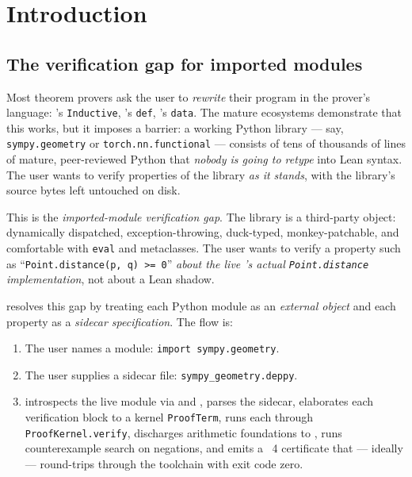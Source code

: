 \chapter{Introduction}
\label{ch:intro}

\section{The verification gap for imported modules}
\label{sec:gap}

Most theorem provers ask the user to \emph{rewrite} their program in
the prover's language: \Coq's \texttt{Inductive}, \Lean's
\texttt{def}, \Agda's \texttt{data}.  The mature ecosystems
\citep{LeanFour, LeanCommunityMathlib} demonstrate that this works,
but it imposes a barrier: a working Python library --- say,
\texttt{sympy.geometry} or \texttt{torch.nn.functional} --- consists
of tens of thousands of lines of mature, peer-reviewed Python that
\emph{nobody is going to retype} into Lean syntax.  The user wants to
verify properties of the library \emph{as it stands}, with the
library's source bytes left untouched on disk.

This is the \emph{imported-module verification gap}.  The library is
a third-party object: dynamically dispatched, exception-throwing,
duck-typed, monkey-patchable, and comfortable with \texttt{eval} and
metaclasses.  The user wants to verify a property such as
``\texttt{Point.distance(p, q) >= 0}'' \emph{about the live
\Sympy{}'s actual \texttt{Point.distance} implementation}, not about a
Lean shadow.

\Deppy{} resolves this gap by treating each Python module as an
\emph{external object} and each property as a \emph{sidecar
specification}.  The flow is:

\begin{enumerate}[leftmargin=2.4em]
\item The user names a module: \texttt{import sympy.geometry}.
\item The user supplies a sidecar file:
  \verb|sympy_geometry.deppy|.
\item \Deppy{} introspects the live module via \Importlib{} and
  \Inspect{}, parses the sidecar, elaborates each verification block
  to a kernel \texttt{ProofTerm}, runs each through
  \texttt{ProofKernel.verify}, discharges arithmetic foundations to
  \Zthree{}, runs counterexample search on negations, and emits a
  \Lean{}~4 certificate that --- ideally --- round-trips through the
  \Lean{} toolchain with exit code zero.
\end{enumerate}


